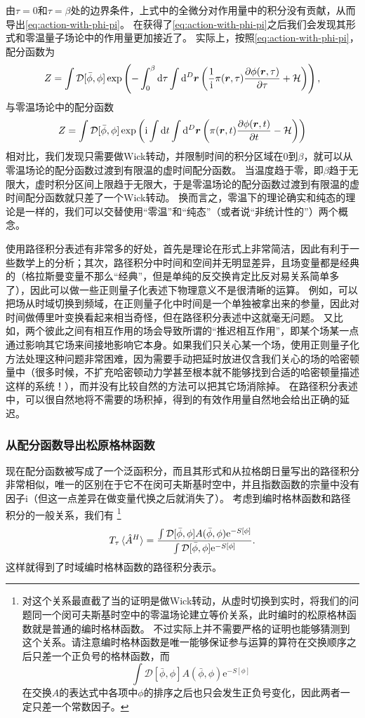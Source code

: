 \documentclass[hyperref, UTF8, a4paper]{ctexart}
\newcommand*{\ii}{\mathrm{i}}
\newcommand*{\ee}{\mathrm{e}}
\newcommand*{\fd}[1]{\mathcal{D}{#1}}
\begin{document}
由$\tau=0$和$\tau=\beta$处的边界条件，上式中的全微分对作用量中的积分没有贡献，从而导出\eqref{eq:action-with-phi-pi}。
在获得了\eqref{eq:action-with-phi-pi}之后我们会发现其形式和零温量子场论中的作用量更加接近了。
实际上，按照\eqref{eq:action-with-phi-pi}，配分函数为
\[
    Z = \int \fd{[\bar{\phi}, \phi]} \exp \left( - \int_0^\beta \dd{\tau} \int \dd[D]{\vb*{r}} \left( \frac{1}{\ii} \pi(\vb*{r}, \tau) \pdv{\phi(\vb*{r}, \tau)}{\tau} + \mathcal{H} \right) \right),
\]
与零温场论中的配分函数
\[
    Z = \int \fd{[\bar{\phi}, \phi]} \exp \left( \ii \int \dd{t} \int \dd[D]{\vb*{r}} \left( \pi(\vb*{r}, t) \pdv{\phi(\vb*{r}, t)}{t} - \mathcal{H} \right) \right)
\]
相对比，我们发现只需要做Wick转动，并限制时间的积分区域在$0$到$\beta$，就可以从零温场论的配分函数过渡到有限温的虚时间配分函数。
当温度趋于零，即$\beta$趋于无限大，虚时积分区间上限趋于无限大，于是零温场论的配分函数过渡到有限温的虚时间配分函数就只差了一个Wick转动。
换而言之，零温下的理论确实和纯态的理论是一样的，我们可以交替使用“零温”和“纯态”（或者说“非统计性的”）两个概念。

使用路径积分表述有非常多的好处，首先是理论在形式上非常简洁，因此有利于一些数学上的分析；其次，路径积分中时间和空间并无明显差异，且场变量都是经典的（格拉斯曼变量不那么“经典”，但是单纯的反交换肯定比反对易关系简单多了），因此可以做一些正则量子化表述下物理意义不是很清晰的运算。
例如，可以把场从时域切换到频域，在正则量子化中时间是一个单独被拿出来的参量，因此对时间做傅里叶变换看起来相当奇怪，但在路径积分表述中这就毫无问题。
又比如，两个彼此之间有相互作用的场会导致所谓的“推迟相互作用”，即某个场某一点通过影响其它场来间接地影响它本身。如果我们只关心某一个场，使用正则量子化方法处理这种问题非常困难，因为需要手动把延时放进仅含我们关心的场的哈密顿量中（很多时候，不扩充哈密顿动力学甚至根本就不能够找到合适的哈密顿量描述这样的系统！），而并没有比较自然的方法可以把其它场消除掉。
在路径积分表述中，可以很自然地将不需要的场积掉，得到的有效作用量自然地会给出正确的延迟。

\subsubsection{从配分函数导出松原格林函数}

现在配分函数被写成了一个泛函积分，而且其形式和从拉格朗日量写出的路径积分非常相似，唯一的区别在于它不在闵可夫斯基时空中，并且指数函数的宗量中没有因子$\ii$（但这一点差异在做变量代换之后就消失了）。
考虑到编时格林函数和路径积分的一般关系，我们有%
\footnote{对这个关系最直截了当的证明是做Wick转动，从虚时切换到实时，将我们的问题同一个闵可夫斯基时空中的零温场论建立等价关系，此时编时的松原格林函数就是普通的编时格林函数。
不过实际上并不需要严格的证明也能够猜测到这个关系。请注意编时格林函数是唯一能够保证参与运算的算符在交换顺序之后只差一个正负号的格林函数，而
\[
    \int \fd{[\bar{\phi}, \phi]} A(\bar{\phi}, \phi) \ee^{- S[\phi]}
\]
在交换$A$的表达式中各项中$\phi$的排序之后也只会发生正负号变化，因此两者一定只差一个常数因子。
}%
\begin{equation}
    T_\tau \expval*{\hat{A}^H} = \frac{\int \fd{[\bar{\phi}, \phi]} A(\bar{\phi}, \phi) \ee^{- S[\phi]}}{\int \fd{[\bar{\phi}, \phi]} \ee^{- S[\phi]}}.
    \label{eq:imaginary-time-order-path-integral}
\end{equation}
这样就得到了时域编时格林函数的路径积分表示。
\end{document}
